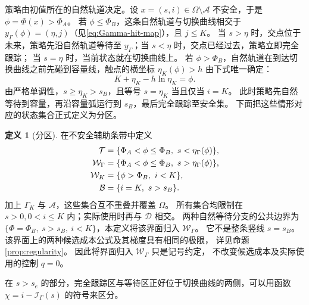 \documentclass[11pt,a4paper,UTF8]{ctexart}
\theoremstyle{definition}
\newtheorem{definition}[theorem]{定义}
\newcommand{\Acal}{\mathcal A}
\newcommand{\Dcal}{\mathcal D}
\begin{document}
策略由初值所在的自然轨道决定。设 $x=(s,i)\in\Omega\setminus\Acal$ 不安全，于是 $\phi=\Phi(x)>\Phi_A$。
若 $\phi\le\Phi_B$，这条自然轨道与切换曲线相交于 $y_\Gamma(\phi)=(\eta,j)$（见\eqref{eq:Gamma-hit-map}），且 $j\le K$。
当 $s>\eta$ 时，交点位于未来，策略先沿自然轨道等待至 $y_\Gamma$；当 $s<\eta$ 时，交点已经过去，策略立即完全跟踪；
当 $s=\eta$ 时，当前状态就在切换曲线上。
若 $\phi>\Phi_B$，自然轨道在到达切换曲线之前先碰到容量线，触点的横坐标 $\eta_K(\phi)>h$ 由下式唯一确定：
\begin{equation}
K+\eta_K-h\ln\eta_K=\phi.
\label{eq:capacity-hit-map}
\end{equation}
由严格单调性，$s\ge\eta_K>s_B$，且等号 $s=\eta_K$ 当且仅当 $i=K$。
此时策略先自然等待到容量，再沿容量弧运行到 $s_B$，最后完全跟踪至安全集。
下面把这些情形对应的状态集合正式定义为分区。

\begin{definition}[分区]
\label{def:regions}
在不安全辅助条带中定义
\begin{align}
\mathcal T&=\{\Phi_A<\phi\le\Phi_B,\ s<\eta_\Gamma(\phi)\},\notag\\
\mathcal W_\Gamma&=\{\Phi_A<\phi\le\Phi_B,\ s>\eta_\Gamma(\phi)\},\notag\\
\mathcal W_K&=\{\phi>\Phi_B,\ i<K\},\notag\\
\mathcal B&=\{i=K,\ s>s_B\}.\label{eq:regions}
\end{align}
加上 $\Gamma_K$ 与 $\Acal$，这些集合互不重叠并覆盖 $\Omega$。
所有集合均限制在 $s>0,0<i\le K$ 内；实际使用时再与 $\Dcal$ 相交。
两种自然等待分支的公共边界为
$\{\Phi=\Phi_B,\ s>s_B,\ i<K\}$，本定义将该界面归入 $\mathcal W_\Gamma$。
它不是整条竖线 $s=s_B$。
该界面上的两种候选成本公式及其梯度具有相同的极限，
详见命题\ref{prop:regularity}。
因此将界面归入 $\mathcal W_\Gamma$ 只是记号约定，
不改变候选成本及实际使用的控制 $q=0$。
\end{definition}

在 $s>s_e$ 的部分，完全跟踪区与等待区正好位于切换曲线的两侧，可以用函数 $\chi=i-\mathcal I_\Gamma(s)$ 的符号来区分。
\end{document}
